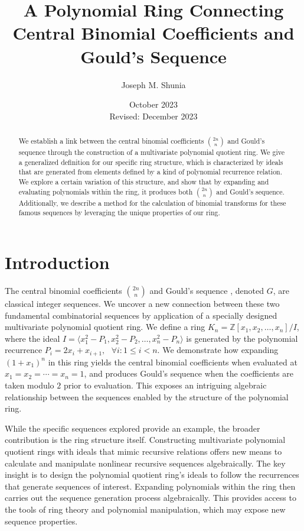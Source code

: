 \documentclass{article}
\theoremstyle{plain}
\theoremstyle{definition}
\newcommand{\Z}{\mathbb{Z}}
\newcommand{\K}{K}
\begin{document}
\title{A Polynomial Ring Connecting Central Binomial Coefficients and Gould's Sequence}
\author{Joseph M. Shunia}
\date{October 2023 \\ \small Revised: December 2023 \normalsize}
\maketitle

\begin{abstract}
We establish a link between the central binomial coefficients $\binom{2n}{n}$ and Gould's sequence through the construction of a multivariate polynomial quotient ring. We give a generalized definition for our specific ring structure, which is characterized by ideals that are generated from elements defined by a kind of polynomial recurrence relation. We explore a certain variation of this structure, and show that by expanding and evaluating  polynomials within the ring, it produces both $\binom{2n}{n}$ and Gould's sequence. Additionally, we describe a method for the calculation of binomial transforms for these famous sequences by leveraging the unique properties of our ring.
\end{abstract}

\section{Introduction}
The central binomial coefficients $\binom{2n}{n}$ \cite{A000984} and Gould's sequence \cite{A001316}, denoted $G$, are classical integer sequences. We uncover a new connection between these two fundamental combinatorial sequences by application of a specially designed multivariate polynomial quotient ring. We define a ring $\K_n = \Z[x_1, x_2, \ldots, x_n]/I$, where the ideal $I = \langle x_1^2 - P_1, x_2^2 - P_2, \ldots, x_n^2 - P_n \rangle$ is generated by the polynomial recurrence $P_i = 2x_i + x_{i+1}, \text{ } \forall i : 1 \leq i < n$. We demonstrate how expanding $(1 + x_1)^n$ in this ring yields the central binomial coefficients when evaluated at $x_1=x_2=\cdots=x_n=1$, and produces Gould's sequence when the coefficients are taken modulo $2$ prior to evaluation. This exposes an intriguing algebraic relationship between the sequences enabled by the structure of the polynomial ring.

While the specific sequences explored provide an example, the broader contribution is the ring structure itself. Constructing multivariate polynomial quotient rings with ideals that mimic recursive relations offers new means to calculate and manipulate nonlinear recursive sequences algebraically. The key insight is to design the polynomial quotient ring's ideals to follow the recurrences that generate sequences of interest. Expanding polynomials within the ring then carries out the sequence generation process algebraically. This provides access to the tools of ring theory and polynomial manipulation, which may expose new sequence properties.
\end{document}
